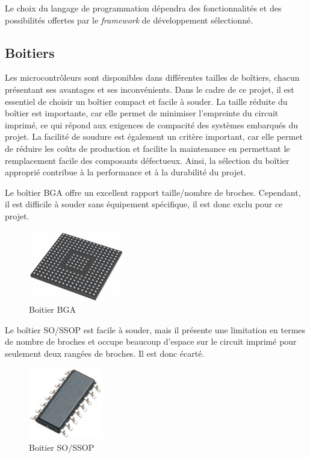 Le choix du langage de programmation dépendra des fonctionnalités et des possibilités offertes par le \textit{framework} de développement sélectionné.

\subsection{Boitiers}

Les microcontrôleurs sont disponibles dans différentes tailles de boîtiers, chacun présentant ses avantages et ses inconvénients.
Dans le cadre de ce projet, il est essentiel de choisir un boîtier compact et facile à souder.
La taille réduite du boîtier est importante, car elle permet de minimiser l'empreinte du circuit imprimé, ce qui répond aux exigences de compacité des systèmes embarqués du projet.
La facilité de soudure est également un critère important, car elle permet de réduire les coûts de production et facilite la maintenance en permettant le remplacement facile des composants défectueux.
Ainsi, la sélection du boîtier approprié contribue à la performance et à la durabilité du projet.

Le boîtier BGA offre un excellent rapport taille/nombre de broches.
Cependant, il est difficile à souder sans équipement spécifique, il est donc exclu pour ce projet.

\begin{figure}[H]
    \centering
    \includegraphics[scale=0.4]{./assets/figures/bga.jpg}
    \caption{\cite{bga} Boitier BGA}
\end{figure}

Le boîtier SO/SSOP est facile à souder, mais il présente une limitation en termes de nombre de broches et occupe beaucoup d'espace sur le circuit imprimé pour seulement deux rangées de broches.
Il est donc écarté.

\begin{figure}[H]
    \centering
    \includegraphics[scale=0.45]{./assets/figures/so_ssop.jpg}
    \caption{\cite{so_ssop} Boitier SO/SSOP}
\end{figure}

